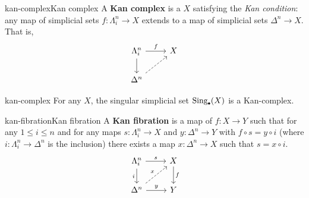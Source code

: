 \begin{topic}{kan-complex}{Kan complex}
    A \textbf{Kan complex} is a  $X$ satisfying the \textit{Kan condition}: any map of simplicial sets $f : \Lambda^n_i \to X$ extends to a map of simplicial sets $\Delta^n \to X$. That is,
    \[ \begin{tikzcd} \Lambda^n_i \arrow{r}{f} \arrow{d} & X \\ \Delta^n \arrow[dashed]{ur} & \end{tikzcd} \]
\end{topic}

\begin{example}{kan-complex}
    For any  $X$, the singular simplicial set $\text{Sing}_\bdot(X)$ is a Kan-complex.
\end{example}

\begin{topic}{kan-fibration}{Kan fibration}
    A \textbf{Kan fibration} is a map of  $f : X \to Y$ such that for any $1 \le i \le n$ and for any maps $s : \Lambda^n_i \to X$ and $y : \Delta^n \to Y$ with $f \circ s = y \circ i$ (where $i : \Lambda^n_i \to \Delta^n$ is the inclusion) there exists a map $x : \Delta^n \to X$ such that $s = x \circ i$.
    \[ \begin{tikzcd} \Lambda^n_i \arrow{r}{s} \arrow[swap]{d}{i} & X \arrow{d}{f} \\ \Delta^n \arrow{r}{y} \arrow[dashed]{ur}{x} & Y \end{tikzcd} \]
\end{topic}

